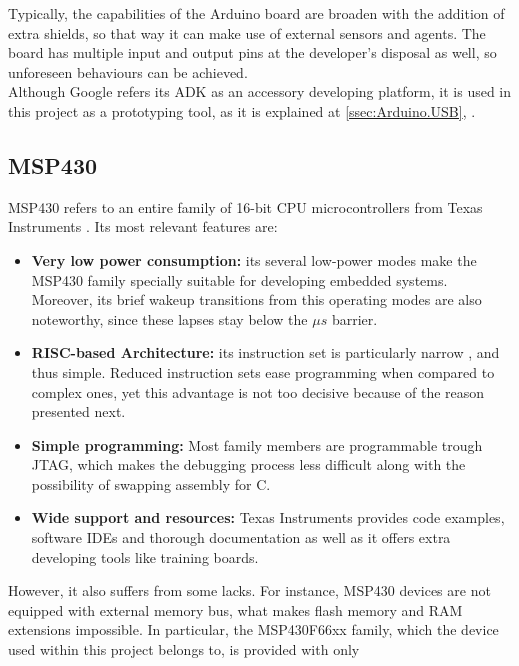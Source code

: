 			Typically, the capabilities of the Arduino board are broaden with the addition of extra shields,
			so that way it can make use of external sensors and agents. The board has multiple input and
			output pins at the developer's disposal as well, so unforeseen behaviours can be achieved.\\
			
			Although Google refers its ADK as an accessory developing platform, it is used in this project
			as a prototyping tool, as it is explained at \autoref{ssec:Arduino.USB}, .
			
		\subsection{MSP430}
		\label{ssec:msp430}
			MSP430 refers to an entire family of 16-bit CPU microcontrollers from Texas Instruments \cite{msp430}.
			Its most relevant features are:
			\begin{itemize}
				\item \textbf{Very low power consumption:} its several low-power modes make the MSP430 
					family specially suitable for developing embedded systems. Moreover, its brief wakeup 
					transitions from this operating modes are also noteworthy, since these lapses stay 
					below the $\mu s$ barrier.
				\item \textbf{RISC-based Architecture:} its instruction set is particularly narrow \cite{msp430iss}, 
					and thus simple. Reduced instruction sets ease programming when compared to complex ones,
					yet this advantage is not too decisive because of the reason presented next.
				\item \textbf{Simple programming:} Most family members are programmable trough JTAG, which
					makes the debugging process less difficult along with the possibility of swapping
					assembly for C.
				\item \textbf{Wide support and resources:} Texas Instruments provides code examples, software 
					IDEs and thorough documentation as well as it offers extra developing tools like training 
					boards.
			\end{itemize}
			However, it also suffers from some lacks. For instance, MSP430 devices are not equipped with
			external memory bus, what makes flash memory and RAM extensions impossible. In particular, the
			MSP430F66xx family, which the device used within this project belongs to, is provided with only 
